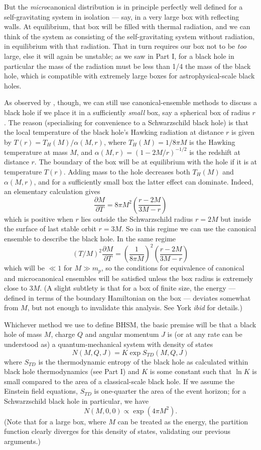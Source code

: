 \documentclass[12pt]{article}
\newcommand{\pbp}[2]{\ensuremath{\frac{\partial #1}{\partial #2}}}
\newcommand{\be}{\begin{equation}}
\newcommand{\ee}{\end{equation}}
\begin{document}
But the \emph{micro}canonical distribution is in principle perfectly well defined for a self-gravitating system in isolation --- say, in a very large box with reflecting walls. At equilibrium, that box will be filled with thermal radiation, and we can think of the system as consisting of the self-gravitating system without radiation, in equilibrium with that radiation. That in turn requires our box not to be \emph{too} large, else it will again be unstable; as we saw in Part I, for a black hole in particular the mass of the radiation must be less than 1/4 the mass of the black hole, which is compatible with extremely large boxes for astrophysical-scale black holes.



As observed by , though, we can still use canonical-ensemble methods to discuss a black hole if we place it in a sufficiently \emph{small} box, say a spherical box of radius $r$. The reason (specialising for convenience to a Schwarzschild black hole) is that the local temperature of the black hole's Hawking radiation at distance $r$ is given by $T(r)=T_H(M)/\alpha(M,r)$, where $T_H(M)=1/8\pi M$ is the Hawking temperature at mass $M$, and $\alpha(M,r)=(1-2M/r)^{-1/2}$ is the redshift at distance $r$. The boundary of the box will be at equilibrium with the hole if it is at temperature $T(r)$. Adding mass to the hole decreases both $T_H(M)$ and $\alpha(M,r)$, and for a sufficiently small box the latter effect can dominate. Indeed, an elementary calculation gives
\be
\pbp{M}{T}=8\pi M^2 \left(\frac{r-2M}{3M-r}\right)
\ee
which is positive when $r$ lies outside the Schwarzschild radius $r=2M$ but inside the surface of last stable orbit $r=3M$. So in this regime we can use the canonical ensemble to describe the black hole. In the same regime 
\be
(T/M)^2\pbp{M}{T} = \left(\frac{1}{8 \pi M}\right)^2  \left(\frac{r-2M}{3M-r}\right)
\ee
which will be $\ll 1$ for $M \gg m_p$, so the conditions for equivalence of canonical and microcanonical ensembles will be satisfied unless the box radius is extremely close to $3M$. (A slight subtlety is that for a box of finite size, the energy --- defined in terms of the boundary Hamiltonian on the box --- deviates somewhat from $M$, but not enough to invalidate this analysis. See York \emph{ibid} for details.)



Whichever method we use to define BHSM, the basic premise will be that a black hole of mass $M$, charge $Q$ and angular momentum $J$ is (or at any rate can be understood as) a quantum-mechanical system with density of states
\be \label{densityofstates}
N(M,Q,J) = K \exp S_{TD}(M,Q,J)
\ee
where $S_{TD}$ is the thermodynamic entropy of the black hole as calculated within black hole thermodynamics (see Part I) and $K$ is some constant such that $\ln K$ is small compared to the area of a classical-scale black hole. If we assume the Einstein field equations, $S_{TD}$ is one-quarter the area of the event horizon; for a Schwarzschild black hole in particular, we have
\be
N(M,0,0) \propto\exp (4 \pi M^2).\ee
(Note that for a large box, where $M$ can be treated as the energy, the partition function clearly diverges for this density of states, validating our previous arguments.)
\end{document}
